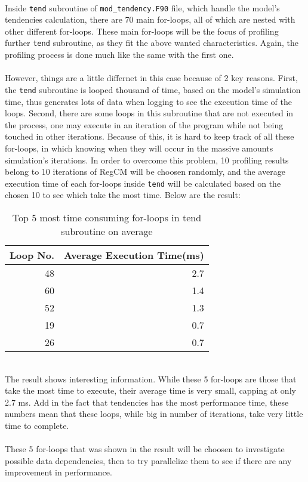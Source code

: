 ~\\
Inside \verb|tend| subroutine of \verb|mod_tendency.F90| file, which handle the model's tendencies calculation, there are 70 main for-loops, all of which are nested with other different for-loops. These main for-loops will be the focus of profiling further \verb|tend| subroutine, as they fit the above wanted characteristics. Again, the profiling process is done much like the same with the first one. \\
~\\
However, things are a little differnet in this case because of 2 key reasons. First, the \verb|tend| subroutine is looped thousand of time, based on the model's simulation time, thus generates lots of data when logging to see the execution time of the loops. Second, there are some loops in this subroutine that are not executed in the process, one may execute in an iteration of the program while not being touched in other iterations. Because of this, it is hard to keep track of all these for-loops, in which knowing when they will occur in the massive amounts simulation's iterations. In order to overcome this problem, 10 profiling results belong to 10 iterations of RegCM will be choosen randomly, and the average execution time of each for-loops inside \verb|tend| will be calculated based on the chosen 10 to see which take the most time. Below are the result: \\
\begin{table}[H]
\centering
\begin{tabular}{@{}rr@{}}
\toprule
Loop No. & Average Execution Time(ms) \\ \midrule
48       & 2.7                        \\
60       & 1.4                        \\
52       & 1.3                        \\
19       & 0.7                        \\
26       & 0.7                        \\ \bottomrule
\end{tabular}%
\caption{Top 5 most time consuming for-loops in tend subroutine on average}
\label{my-label}
\end{table}
~\\
The result shows interesting information. While these 5 for-loops are those that take the most time to execute, their average time is very small, capping at only 2.7 ms. Add in the fact that tendencies has the most performance time, these numbers mean that these loops, while big in number of iterations, take very little time to complete. \\
~\\
These 5 for-loops that was shown in the result will be choosen to investigate possible data dependencies, then to try parallelize them to see if there are any improvement in performance. \\

